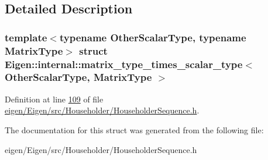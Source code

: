 \subsection{Detailed Description}
\subsubsection*{template$<$typename Other\+Scalar\+Type, typename Matrix\+Type$>$\newline
struct Eigen\+::internal\+::matrix\+\_\+type\+\_\+times\+\_\+scalar\+\_\+type$<$ Other\+Scalar\+Type, Matrix\+Type $>$}



Definition at line \hyperlink{eigen_2_eigen_2src_2_householder_2_householder_sequence_8h_source_l00109}{109} of file \hyperlink{eigen_2_eigen_2src_2_householder_2_householder_sequence_8h_source}{eigen/\+Eigen/src/\+Householder/\+Householder\+Sequence.\+h}.



The documentation for this struct was generated from the following file\+:\begin{DoxyCompactItemize}
\item 
eigen/\+Eigen/src/\+Householder/\+Householder\+Sequence.\+h\end{DoxyCompactItemize}
